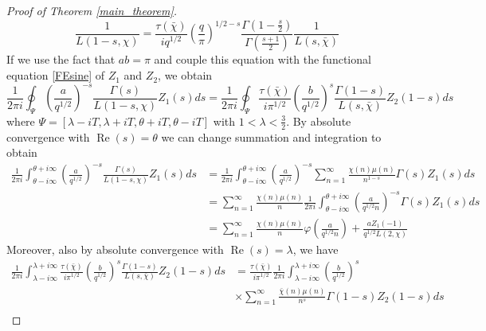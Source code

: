 \documentclass[11pt]{article}
\numberwithin{equation}{section}		 			%
\numberwithin{figure}{section}			 			%
\begin{document}
\begin{proof}[Proof of Theorem \eqref{main_theorem}]
\[
\frac{1}
{{L(1 - s,\chi )}} = \frac{{\tau (\bar \chi )}}
{{iq^{1/2} }}\left( {\frac{q}
{\pi }} \right)^{1/2 - s} \frac{{\Gamma (1 - \tfrac{s}
{2})}}
{{\Gamma (\tfrac{{s + 1}}
{2})}}\frac{1}
{{L(s,\bar \chi )}}
\]
If we use the fact that $ab = \pi$ and couple this equation with the functional equation \eqref{FEsine} of $Z_1$ and $Z_2$, we obtain
\[
\frac{1}
{{2\pi i}}\oint_\Psi  {\left( {\frac{a}
{{q^{1/2} }}} \right)^{ - s} \frac{{\Gamma (s)}}
{{L(1 - s,\chi )}}Z_1 (s)ds}  = \frac{1}
{{2\pi i}}\oint_\Psi  {\frac{{\tau (\bar \chi )}}
{{i\pi ^{1/2} }}\left( {\frac{b}
{{q^{1/2} }}} \right)^s \frac{{\Gamma (1 - s)}}
{{L(s,\bar \chi )}}Z_2 (1 - s)ds} 
\]
where $\Psi  = [\lambda  - iT,\lambda  + iT,\theta  + iT,\theta  - iT]$ with $1 < \lambda  < \tfrac{3}{2}$. By absolute convergence with $\operatorname{Re}(s) = \theta$ we can change summation and integration to obtain
\begin{align}
  \frac{1}
{{2\pi i}}\int_{\theta  - i\infty }^{\theta  + i\infty } {\left( {\frac{a}
{{q^{1/2} }}} \right)^{ - s} \frac{{\Gamma (s)}}
{{L(1 - s,\chi )}}Z_1 (s)ds} &= \frac{1}
{{2\pi i}}\int_{\theta  - i\infty }^{\theta  + i\infty } {\left( {\frac{a}
{{q^{1/2} }}} \right)^{ - s} \sum\limits_{n = 1}^\infty  {\frac{{\chi (n)\mu (n)}}
{{n^{1 - s} }}} \Gamma (s)Z_1 (s)ds}  \nonumber \\
   &= \sum\limits_{n = 1}^\infty  {\frac{{\chi (n)\mu (n)}}
{n}\frac{1}
{{2\pi i}}\int_{\theta  - i\infty }^{\theta  + i\infty } {\left( {\frac{a}
{{q^{1/2} n}}} \right)^{ - s} \Gamma (s)Z_1 (s)ds} }  \nonumber \\
   &= \sum\limits_{n = 1}^\infty  {\frac{{\chi (n)\mu (n)}}
{n}\varphi \left( {\frac{a}
{{q^{1/2} n}}} \right)}  + \frac{{aZ_1 ( - 1)}}
{{q^{1/2} L(2,\chi )}} 
\end{align}
Moreover, also by absolute convergence with $\operatorname{Re}(s) = \lambda$, we have
\begin{align}
  \frac{1}
{{2\pi i}}\int_{\lambda  - i\infty }^{\lambda  + i\infty } {\frac{{\tau (\bar \chi )}}
{{i\pi ^{1/2} }}\left( {\frac{b}
{{q^{1/2} }}} \right)^s \frac{{\Gamma (1 - s)}}
{{L(s,\bar \chi )}}Z_2 (1 - s)ds} &= \frac{{\tau (\bar \chi )}}
{{i\pi ^{1/2} }}\frac{1}
{{2\pi i}}\int_{\lambda  - i\infty }^{\lambda  + i\infty } {\left( {\frac{b}
{{q^{1/2} }}} \right)^s }  \nonumber \\
   &\times \sum\limits_{n = 1}^\infty  {\frac{{\bar \chi (n)\mu (n)}}
{{n^s }}} \Gamma (1 - s)Z_2 (1 - s)ds \nonumber \\

\end{align}
\end{proof}
\end{document}
